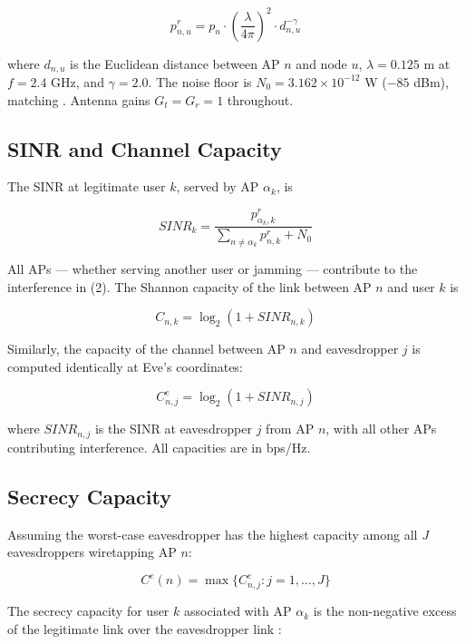 \documentclass[conference]{IEEEtran}
\begin{document}
\begin{equation}
p^r_{n,u}=p_n\cdot\left(\frac{\lambda}{4\pi}\right)^2\cdot d_{n,u}^{-\gamma}
\end{equation}

where $d_{n,u}$ is the Euclidean distance between AP $n$ and node $u$, $\lambda=0.125$ m at $f=2.4$ GHz, and $\gamma=2.0$. The noise floor is $N_0=3.162\times10^{-12}$ W ($-85$ dBm), matching \cite{hoseini}. Antenna gains $G_t=G_r=1$ throughout.

\subsection{SINR and Channel Capacity}

The SINR at legitimate user $k$, served by AP $\alpha_k$, is

\begin{equation}
SINR_k=
\frac{p^r_{\alpha_k,k}}
{\sum_{n\neq\alpha_k}p^r_{n,k}+N_0}
\end{equation}

All APs --- whether serving another user or jamming --- contribute to the interference in (2). The Shannon capacity of the link between AP $n$ and user $k$ is

\begin{equation}
C_{n,k}=\log_2(1+SINR_{n,k})
\end{equation}

Similarly, the capacity of the channel between AP $n$ and eavesdropper $j$ is computed identically at Eve's coordinates:

\begin{equation}
C^e_{n,j}=\log_2(1+SINR_{n,j})
\end{equation}

where $SINR_{n,j}$ is the SINR at eavesdropper $j$ from AP $n$, with all other APs contributing interference. All capacities are in bps/Hz.

\subsection{Secrecy Capacity}

Assuming the worst-case eavesdropper has the highest capacity among all $J$ eavesdroppers wiretapping AP $n$:

\begin{equation}
C^e(n)=\max\{C^e_{n,j}:j=1,\dots,J\}
\end{equation}

The secrecy capacity for user $k$ associated with AP $\alpha_k$ is the non-negative excess of the legitimate link over the eavesdropper link \cite{wyner,gaussian,broadcast}:
\end{document}
